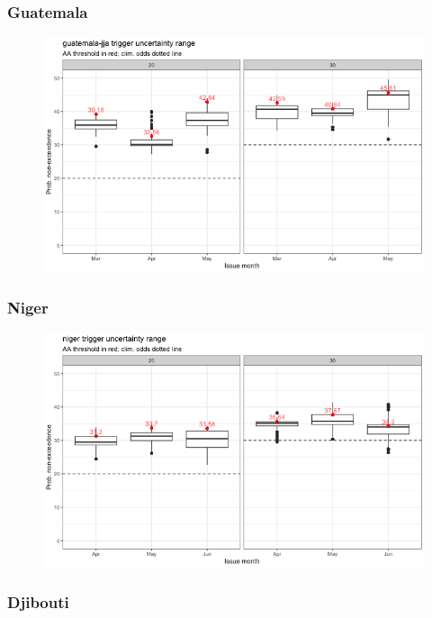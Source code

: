 \documentclass{ametsocV5}
\begin{document}
\subsubsection{Guatemala}

\begin{figure}
    \centering
    \includegraphics[width=0.9\linewidth]{figures/guatemala-jja.png}
\end{figure}

\subsubsection{Niger}

\begin{figure}
    \centering
    \includegraphics[width=0.9\linewidth]{figures/niger.png}
\end{figure}

\subsubsection{Djibouti}
\end{document}
